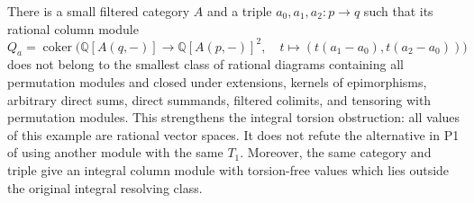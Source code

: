 \begin{proposition}\label{B:P1-rational}
There is a small filtered category $A$ and a triple
$a_0,a_1,a_2:p\to q$ such that its rational column module
\[
 Q_a=\operatorname{coker}\bigl(
 \mathbb Q[A(q,-)]\longrightarrow\mathbb Q[A(p,-)]^2,\quad
 t\longmapsto(t(a_1-a_0),t(a_2-a_0))\bigr)
\]
does not belong to the smallest class of rational diagrams containing
all permutation modules and closed under extensions, kernels of
epimorphisms, arbitrary direct sums, direct summands, filtered colimits,
and tensoring with permutation modules. This strengthens the integral
torsion obstruction: all values of this example are rational vector
spaces. It does not refute the alternative in P1 of using another
module with the same $T_1$. Moreover, the same category and triple
give an integral column module with torsion-free values which lies
outside the original integral resolving class.
\end{proposition}
